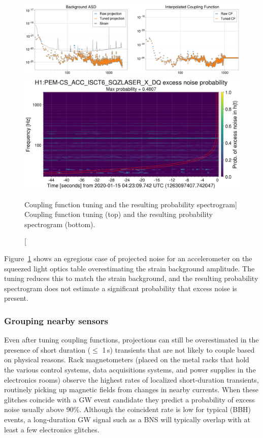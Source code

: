 \begin{figure}
	\includegraphics[width=\textwidth]{figures/noise-studies/vetting-tuning1.png}
	\includegraphics[width=\textwidth]{figures/noise-studies/vetting-tuning2.png}
	\caption
	[Coupling function tuning and the resulting probability spectrogram]
	{
		Coupling function tuning (top) and the resulting probability spectrogram (bottom).}
	\label{fig:vetting-tuning}
\end{figure}

Figure~\ref{fig:vetting-tuning} shows an egregious case of projected noise for an accelerometer on the squeezed light optics table overestimating the strain background amplitude.
The tuning reduces this to match the strain background, and the resulting probability spectrogram does not estimate a significant probability that excess noise is present.


\subsubsection{Grouping nearby sensors}

Even after tuning coupling functions, projections can still be overestimated in the presence of short duration ($\leq$ 1\,s) transients that are not likely to couple based on physical reasons.
Rack magnetometers (placed on the metal racks that hold the various control systems, data acquisitions systems, and power supplies in the electronics rooms) observe the highest rates of localized short-duration transients, routinely picking up magnetic fields from changes in nearby currents.
When these glitches coincide with a \ac{GW} event candidate they predict a probability of excess noise usually above 90\%.
Although the coincident rate is low for typical (\ac{BBH}) events, a long-duration \ac{GW} signal such as a \ac{BNS} will typically overlap with at least a few electronics glitches.


